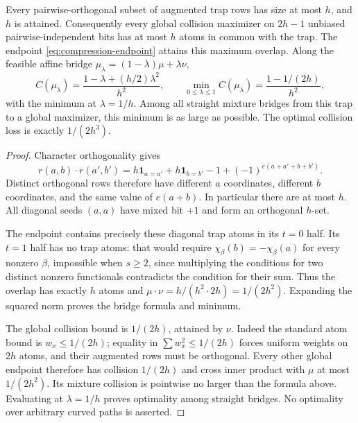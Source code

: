 \begin{theorem}
\label{thm:compression-optimal-overlap}
Every pairwise-orthogonal subset of augmented trap rows has size at most
$h$, and $h$ is attained. Consequently every global collision maximizer
on $2h-1$ unbiased pairwise-independent bits has at most $h$ atoms in
common with the trap. The endpoint \eqref{eq:compression-endpoint}
attains this maximum overlap. Along the feasible affine bridge
$\mu_\lambda=(1-\lambda)\mu+\lambda\nu$,
\[
 C(\mu_\lambda)=\frac{1-\lambda+(h/2)\lambda^2}{h^2},\qquad
 \min_{0\le\lambda\le1}C(\mu_\lambda)
 =\frac{1-1/(2h)}{h^2},
\]
with the minimum at $\lambda=1/h$.
Among all straight mixture bridges from this trap to a global maximizer,
this minimum is as large as possible. The optimal collision loss is
exactly $1/(2h^3)$.
\end{theorem}
\begin{proof}
Character orthogonality gives
\[
 r(a,b)\cdot r(a',b')=
 h\mathbf1_{a=a'}+h\mathbf1_{b=b'}-1+
 (-1)^{e(a+a'+b+b')}.
\]
Distinct orthogonal rows therefore have different $a$ coordinates,
different $b$ coordinates, and the same value of $e(a+b)$.
In particular there are at most $h$. All diagonal seeds $(a,a)$ have
mixed bit $+1$ and form an orthogonal $h$-set.

The endpoint contains precisely these diagonal trap atoms in its $t=0$
half. Its $t=1$ half has no trap atoms: that would require
$\chi_\beta(b)=-\chi_\beta(a)$ for every nonzero $\beta$, impossible
when $s\ge2$, since multiplying the conditions for two distinct nonzero
functionals contradicts the condition for their sum. Thus the overlap
has exactly $h$ atoms and
$\mu\cdot\nu=h/(h^2\cdot2h)=1/(2h^2)$.
Expanding the squared norm proves the bridge formula and minimum.

The global collision bound is $1/(2h)$, attained by $\nu$. Indeed the
standard atom bound is $w_x\le1/(2h)$; equality in
$\sum w_x^2\le1/(2h)$ forces uniform weights on $2h$ atoms, and their
augmented rows must be orthogonal. Every other global endpoint therefore
has collision $1/(2h)$ and cross inner product with $\mu$ at most
$1/(2h^2)$. Its mixture collision is pointwise no larger than the
formula above. Evaluating at $\lambda=1/h$ proves optimality among
straight bridges. No optimality over arbitrary curved paths is asserted.
\end{proof}

